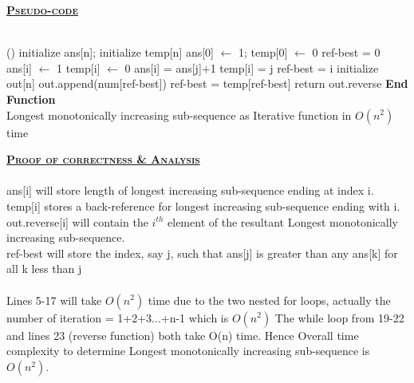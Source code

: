 \documentclass[a4 paper]{article}
\begin{document}

\textbf{\underline{\textsc{Pseudo-code}}}\\\\
\begin{algorithm}[H]
\SetAlgoLined
{}
%
\Fn(){\FRecurs}
{
    initialize ans[n]; initialize temp[n]\;
    ans[0] $\leftarrow$ 1; temp[0] $\leftarrow$ 0\;
    ref-best = 0\;
    {
        ans[i] $\leftarrow$ 1\;
        temp[i] $\leftarrow$ 0\;
        {
            {
                ans[i] = ans[j]+1\;
                temp[i] = j\;
            }
        }
        {   
            ref-best = i\;
        }
    }
    initialize out[n]\;
    {
        out.append(num[ref-best])\;
        ref-best = temp[ref-best]\;
    }
    return out.reverse
}
\textbf{End Function}\\
\caption{Longest monotonically increasing sub-sequence as Iterative function in $O(n^{2})$ time}
\end{algorithm}
\vspace{4mm}
\textbf{\underline{\textsc{Proof of correctness \& Analysis}}}\\\\
ans[i] will store length of longest increasing sub-sequence ending at index i.\\ temp[i] stores a back-reference for longest increasing sub-sequence ending with i.\\ out.reverse[i] will contain the $i^{th}$ element of the resultant Longest monotonically increasing sub-sequence.\\
ref-best will store the index, say j, such that ans[j] is greater than any ans[k] for all k less than j\\\\
Lines 5-17 will take $O(n^{2})$ time due to the two nested for loops, actually the number of iteration = 1+2+3...+n-1 which is $O(n^{2})$ The while loop from 19-22 and lines 23 (reverse function) both take O(n) time. Hence Overall time complexity to determine Longest monotonically increasing sub-sequence is $O(n^{2})$.
\end{document}
